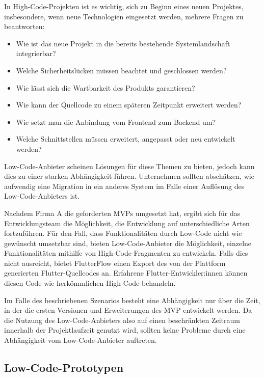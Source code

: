 \documentclass[acmtog, language=ngerman]{acmart}
\begin{document}
In High-Code-Projekten ist es wichtig, sich zu Beginn eines neuen Projektes, insbesondere, wenn neue Technologien eingesetzt werden, mehrere Fragen zu beantworten: 

\begin{itemize}
    \item Wie ist das neue Projekt in die bereits bestehende Systemlandschaft integrierbar? 
    \item Welche Sicherheitslücken müssen beachtet und geschlossen werden?
    \item Wie lässt sich die Wartbarkeit des Produkts garantieren? 
    \item Wie kann der Quellcode zu einem späteren Zeitpunkt erweitert werden? 
    \item Wie setzt man die Anbindung vom Frontend zum Backend um? 
    \item Welche Schnittstellen müssen erweitert, angepasst oder neu entwickelt werden? 
\end{itemize}

Low-Code-Anbieter scheinen Lösungen für diese Themen zu bieten, jedoch kann dies zu einer starken Abhängigkeit führen. Unternehmen sollten abschätzen, wie aufwendig eine Migration in ein anderes System im Falle einer Auflösung des Low-Code-Anbieters ist. 

Nachdem Firma A die geforderten MVPs umgesetzt hat, ergibt sich für das Entwicklungsteam die Möglichkeit, die Entwicklung auf unterschiedliche Arten fortzuführen. Für den Fall, dass Funktionalitäten durch Low-Code nicht wie gewünscht umsetzbar sind, bieten Low-Code-Anbieter die Möglichkeit, einzelne Funktionalitäten mithilfe von High-Code-Fragmenten zu entwickeln. Falls dies nicht ausreicht, bietet FlutterFlow einen Export des von der Plattform generierten Flutter-Quellcodes an. Erfahrene Flutter-Entwickler:innen können diesen Code wie herkömmlichen High-Code behandeln.

Im Falle des beschriebenen Szenarios besteht eine Abhängigkeit nur über die Zeit, in der die ersten Versionen und Erweiterungen des MVP entwickelt werden. Da die Nutzung des Low-Code-Anbieters also auf einen beschränkten Zeitraum innerhalb der Projektlaufzeit genutzt wird, sollten keine Probleme durch eine Abhängigkeit vom Low-Code-Anbieter auftreten.

\subsection{Low-Code-Prototypen}
\end{document}
